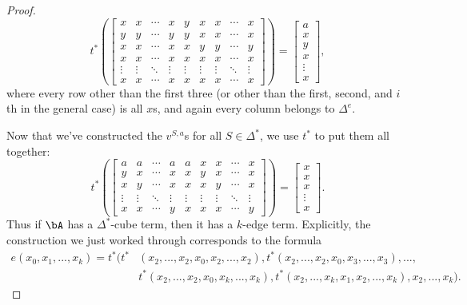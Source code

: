 \begin{proof}
\[t^*\left(\begin{bmatrix} x & x & \cdots & x & y & x & x & \cdots & x\\ y & y & \cdots & y & y & x & x & \cdots & x\\ x & x & \cdots & x & x & y & y & \cdots & y\\ x & x & \cdots & x & x & x & x & \cdots & x\\ \vdots & \vdots & \ddots & \vdots & \vdots & \vdots & \vdots & \ddots & \vdots \\ x & x & \cdots & x & x & x & x & \cdots & x \end{bmatrix}\right) = \begin{bmatrix}a\\ x\\ y\\ x\\ \vdots \\ x\end{bmatrix},
\]
where every row other than the first three (or other than the first, second, and $i$th in the general case) is all $x$s, and again every column belongs to $\Delta^e$.

Now that we've constructed the $v^{S,a}$s for all $S \in \Delta^*$, we use $t^*$ to put them all together:
\[
t^*\left(\begin{bmatrix} a & a & \cdots & a & a & x & x & \cdots & x\\ y & x & \cdots & x & x & y & x & \cdots & x\\ x & y & \cdots & x & x & x & y & \cdots & x\\ \vdots & \vdots & \ddots & \vdots & \vdots & \vdots & \vdots & \ddots & \vdots \\ x & x & \cdots & y & x & x & x & \cdots & y \end{bmatrix}\right) = \begin{bmatrix}x\\ x\\ x\\ \vdots \\ x\end{bmatrix}.
\]
Thus if $\bA$ has a $\Delta^*$-cube term, then it has a $k$-edge term. Explicitly, the construction we just worked through corresponds to the formula
\begin{align*}
e(x_0,x_1,...,x_k) = t^*(t^*&(x_2, ..., x_2, x_0, x_2, ..., x_2), t^*(x_2, ..., x_2, x_0, x_3, ..., x_3), ...,\\
&t^*(x_2, ..., x_2, x_0, x_k, ..., x_k), t^*(x_2, ..., x_k, x_1, x_2, ..., x_k), x_2, ..., x_k).
\end{align*}


\end{proof}

